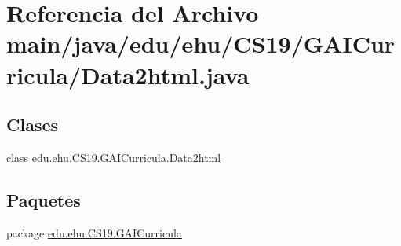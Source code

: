 \hypertarget{a00002}{}\section{Referencia del Archivo main/java/edu/ehu/\+C\+S19/\+G\+A\+I\+Curricula/\+Data2html.java}
\label{a00002}
\subsection*{Clases}
\begin{DoxyCompactItemize}
\item 
class \mbox{\hyperlink{a00024}{edu.\+ehu.\+C\+S19.\+G\+A\+I\+Curricula.\+Data2html}}
\end{DoxyCompactItemize}
\subsection*{Paquetes}
\begin{DoxyCompactItemize}
\item 
package \mbox{\hyperlink{a00017}{edu.\+ehu.\+C\+S19.\+G\+A\+I\+Curricula}}
\end{DoxyCompactItemize}
